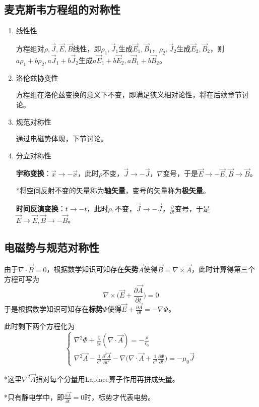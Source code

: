 \documentclass[a4paper,UTF8,fontset=windows]{ctexart}
\newcommand*{\va}{\vec{A}}
\newcommand*{\vb}{\vec{B}}
\newcommand*{\ve}{\vec{E}}
\newcommand*{\vj}{\vec{J}}
\newcommand*{\vx}{\vec{x}}
\newcommand*{\pt}[2][t]{\frac{\partial #2}{\partial #1}}
\newcommand*{\ppt}[2][t^2]{\frac{\partial^2 #2}{\partial #1}}
\begin{document}
\subsection{麦克斯韦方程组的对称性}
\begin{enumerate}
    \item 线性性
    
    方程组对$\rho,\vj,\ve,\vb$线性，即$\rho_1,\vj_1$生成$\ve_1,\vb_1$，$\rho_2,\vj_2$生成$\ve_2,\vb_2$，则$a\rho_1+b\rho_2,a\vj_1+b\vj_2$生成$a\ve_1+b\ve_2,a\vb_1+b\vb_2$。

    \item 洛伦兹协变性
    
    方程组在洛伦兹变换的意义下不变，即满足狭义相对论性，将在后续章节讨论。

    \item 规范对称性
    
    通过电磁势体现，下节讨论。

    \item 分立对称性
    
    \textbf{宇称变换}：$\vx\to-\vx$，此时$\rho$不变，$\vj\to-\vj$，$\nabla$变号，于是$\ve\to-\ve,\vb\to\vb$。
        
    *将空间反射不变的矢量称为\textbf{轴矢量}，变号的矢量称为\textbf{极矢量}。

    \textbf{时间反演变换}：$t\to-t$，此时$\rho,$不变，$\vj\to-\vj$，$\pt{}$变号，于是$\ve\to\ve,\vb\to-\vb$。
\end{enumerate}

\subsection{电磁势与规范对称性}
由于$\nabla\cdot\vb=0$，根据数学知识可知存在\textbf{矢势}$\va$使得$\vb=\nabla\times\va$，此时计算得第三个方程可写为
$$\nabla\times\bigg(\ve+\pt{\va}\bigg)=0$$
于是根据数学知识可知存在\textbf{标势}$\Phi$使得$\ve+\pt{\va}=-\nabla\Phi$。

此时剩下两个方程化为
$$\begin{cases}
    \nabla^2\Phi+\pt{}(\nabla\cdot\va)=-\frac{\rho}{\epsilon_0}\\
    \nabla^2\vec{A}-\frac{1}{c^2}\ppt{\va}-\nabla\big(\nabla\cdot\va+\frac{1}{c^2}\pt{\Phi}\big)=-\mu_0\vj
\end{cases}$$

*这里$\nabla^2\va$指对每个分量用Laplace算子作用再拼成矢量。

*只有静电学中，即$\pt{\va}=0$时，标势才代表电势。
\end{document}

